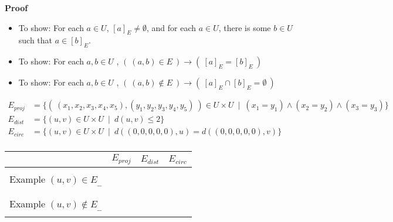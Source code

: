 \documentclass[12pt, oneside]{article}
\begin{document}
{\bf Proof}

\vspace{-15pt}

\begin{itemize}
\item To show: For each  $a \in U$, $[a]_{E}  \neq  \emptyset$, and  for each  $a \in U$, there is some $b \in U$  such that $a \in [b]_{E}$.

\vfill


\item To show: For each  $a,b  \in U$ , $(~(a,b)  \in  E ~)\to (~ [a]_{E}  = [b]_{E}~)$

\vfill

\item To show: For each  $a,b  \in U$ , $(~(a,b)  \notin  E ~)\to (~ [a]_{E} \cap[b]_{E} = \emptyset~)$

\vfill

\end{itemize}






\newpage

\begin{align*}
E_{proj} &=  \{ ( ~(x_1, x_2, x_3, x_4, x_5), (y_1, y_2, y_3, y_4, y_5)~) \in U \times U ~\mid~(x_1 = y_1) \land  (x_2 = y_2) \land (x_3 = y_3) \}  \\
E_{dist} &=  \{ (u,v) \in U \times U ~\mid~ d( u,v ) \leq 2 \}  \\
E_{circ} &=  \{ (u,v) \in U \times U ~\mid~ d( (0,0,0,0,0), u ) =  d( (0,0,0,0,0),v) \}  \\
\end{align*}

\begin{center}
\begin{tabular}{|c|c|c|c|}
\hline
 & $E_{proj}$ &  $E_{dist}$ & $E_{circ}$ \\
\hline & &  &  \\
Example $(u,v) \in E_{\_\_}$ & \phantom{Put example here} &  \phantom{Put example here}  &  \phantom{Put example here}  \\
& &  &  \\
\hline
& &  &  \\
Example $(u,v) \notin E_{\_\_}$ & \phantom{Put example here} &  \phantom{Put example here}  &  \phantom{Put example here}  \\
& &  &  \\
\hline
\end{tabular}
\end{center}
\end{document}
